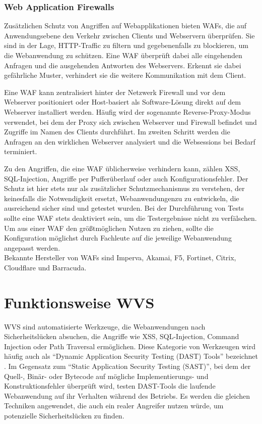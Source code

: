 \documentclass[12pt,oneside,a4paper,parskip,pointlessnumbers]{scrbook}
\begin{document}
    \subsubsection{Web Application Firewalls}
    Zusätzlichen Schutz von Angriffen auf Webapplikationen bieten WAFs, die auf Anwendungsebene den Verkehr zwischen Clients und Webservern überprüfen. Sie sind in der Lage, HTTP-Traffic zu filtern und gegebenenfalls zu blockieren, um die Webanwendung zu schützen.
    Eine WAF überprüft dabei alle eingehenden Anfragen und die ausgehenden Antworten des Webservers.
    Erkennt sie dabei gefährliche Muster, verhindert sie die weitere Kommunikation mit dem Client.

    Eine WAF kann zentralisiert hinter der Netzwerk Firewall und vor dem Webserver positioniert oder Host-basiert als Software-Lösung direkt auf dem Webserver installiert werden.
    Häufig wird der sogenannte Reverse-Proxy-Modus verwendet, bei dem der Proxy sich zwischen Webserver und Firewall befindet und Zugriffe im Namen des Clients durchführt. Im zweiten Schritt werden die Anfragen an den wirklichen Webserver analysiert und die Websessions bei Bedarf terminiert.

    Zu den Angriffen, die eine WAF üblicherweise verhindern kann, zählen XSS, SQL-Injection, Angriffe per Pufferüberlauf oder auch Konfigurationsfehler. Der Schutz ist hier stets nur als zusätzlicher Schutzmechanismus zu verstehen, der keinesfalls die Notwendigkeit ersetzt, Webanwendungenzu zu entwickeln, die ausreichend sicher sind und getestet wurden. Bei der Durchführung von Tests sollte eine WAF stets deaktiviert sein, um die Testergebnisse nicht zu verfälschen.
    Um aus einer WAF den größtmöglichen Nutzen zu ziehen, sollte die Konfiguration möglichst durch Fachleute
    auf die jeweilige Webanwendung angepasst werden. \cite{BSI,WAF}\\
    Bekannte Hersteller von WAFs sind Imperva, Akamai, F5, Fortinet, Citrix, Cloudflare und Barracuda.



    \newpage
  \section{Funktionsweise WVS}
  WVS sind automatisierte Werkzeuge, die Webanwendungen nach Sicherheitslücken absuchen, die Angriffe wie XSS, SQL-Injection, Command Injection oder Path Traversal ermöglichen. Diese Kategorie von Werkzeugen wird häufig auch als ``Dynamic Application Security Testing (DAST) Tools'' bezeichnet \cite{OWASPtools}. Im Gegensatz zum ``Static Application Security Testing (SAST)'', bei dem der Quell-, Binär- oder Bytecode auf mögliche Implementierungs- und Konstruktionsfehler überprüft wird, testen DAST-Tools die laufende Webanwendung auf ihr Verhalten während des Betriebs. Es werden die gleichen Techniken angewendet, die auch ein realer Angreifer nutzen würde, um potenzielle Sicherheitslücken zu finden.
\end{document}
